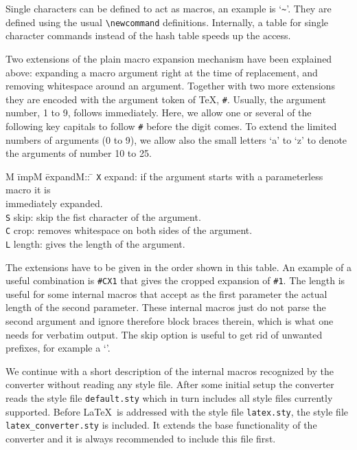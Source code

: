 \documentclass[11pt]{article}
\begin{document}
Single characters can be defined to act as macros, an example is
`\verb+~+'.  They are defined using the usual \verb+\newcommand+
definitions. Internally, a table for single character commands instead
of the hash table speeds up the access.

Two extensions of the plain macro expansion mechanism have been
explained above: expanding a macro argument right at the time of
replacement, and removing whitespace around an argument. Together
with two more extensions they are encoded with the argument token of
\TeX, {\tt \#}. Usually, the argument number, 1 to 9, follows
immediately. Here, we allow one or several of the following key
capitals to follow {\tt \#} before the digit comes. To extend the
limited numbers of arguments (0 to 9), we allow also the small letters
`a' to `z' to denote the arguments of number 10 to 25.

\begin{tabbing}
  M \= impM \= expandM:: \= \kill
  \> \verb+X+ \> expand: \> if the argument starts with a parameterless macro 
                            it is\\ \> \> \> immediately expanded.\\
  \> \verb+S+ \> skip:   \> skip the fist character of the argument.\\
  \> \verb+C+ \> crop:   \> removes whitespace on both sides of the 
                            argument.\\
  \> \verb+L+ \> length: \> gives the length of the argument.
\end{tabbing}

The extensions have to be given in the order shown in this table. An
example of a useful combination is {\tt \#CX1} that gives the cropped
expansion of {\tt \#1}. The length is useful for some internal macros
that accept as the first parameter the actual length of the second
parameter.  These internal macros just do not parse the second
argument and ignore therefore block braces therein, which is what one
needs for verbatim output. The skip option is useful to get rid of
unwanted prefixes, for example a `{\tt \Backslash}'.

We continue with a short description of the internal macros recognized
by the converter without reading any style file. After some initial
setup the converter reads the style file {\tt default.sty} which in
turn includes all style files currently supported. Before \LaTeX\ is
addressed with the style file {\tt latex.sty}, the style file {\tt
  latex\_converter.sty} is included. It extends the base functionality
of the converter and it is always recommended to include this file
first.
\end{document}
